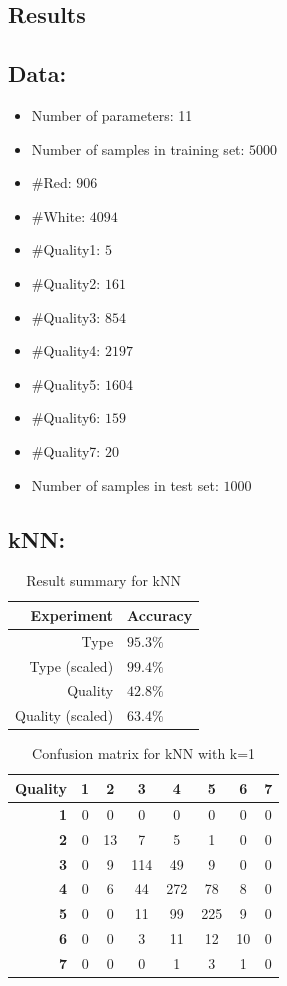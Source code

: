 \documentclass[twoside]{article}
\begin{document}
\begin{multicols}{2}
\section{Results}
\subsection*{\textbf{Data:}}
\begin{itemize}
  \item Number of parameters: 11
  \item Number of samples in training set: $5000$
  \item \#Red: $906$
  \item \#White: $4094$
  \item \#Quality1: $5$
  \item \#Quality2: $161$
  \item \#Quality3: $854$
  \item \#Quality4: $2197$
  \item \#Quality5: $1604$
  \item \#Quality6: $159$
  \item \#Quality7: $20$
  \item Number of samples in test set: $1000$
\end{itemize}

\subsection*{\textbf{kNN:}}
\begin{table}[H]
\caption{Result summary for kNN}
\centering
\begin{tabular}{r|l}
\textbf{Experiment} & \textbf{Accuracy}\\
\midrule
Type  & $95.3\%$\\
Type (scaled) & $99.4\%$\\
\hline
Quality & $42.8\%$\\
Quality (scaled) & $63.4\%$\\
\end{tabular}
\end{table}

\begin{table}[H]
\caption{Confusion matrix for kNN with k=1}
\centering
\begin{tabular}{r||c|c|c|c|c|c|c}
\textbf{Quality} & \textbf{1} & \textbf{2} & \textbf{3} & \textbf{4} & \textbf{5} & \textbf{6} & \textbf{7}\\
\hline \hline
\textbf{1} & 0 & 0 & 0 & 0 & 0 & 0 & 0\\
\hline
\textbf{2} & 0 & 13 & 7 & 5 & 1 & 0 & 0\\
\hline
\textbf{3} & 0 & 9 & 114 & 49 & 9 & 0 & 0\\
\hline
\textbf{4} & 0 & 6 & 44 & 272 & 78 & 8 & 0\\
\hline
\textbf{5} & 0 & 0 & 11 & 99 & 225 & 9 & 0\\
\hline
\textbf{6} & 0 & 0 & 3 & 11 & 12 & 10 & 0\\
\hline
\textbf{7} & 0 & 0 & 0 & 1 & 3 & 1 & 0\\
\end{tabular}
\end{table}



\end{multicols}
\end{document}

